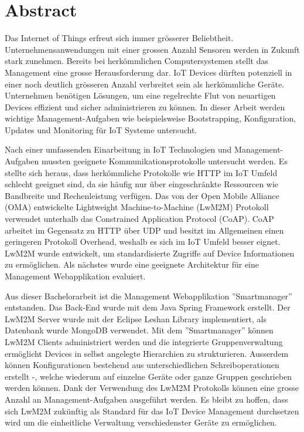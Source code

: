 \chapter*{Abstract}
Das Internet of Things erfreut sich immer grösserer Beliebtheit. Unternehmensanwendungen mit einer grossen Anzahl Sensoren werden in Zukunft stark zunehmen. Bereits bei herkömmlichen Computersystemen stellt das Management eine grosse Herausforderung dar. IoT Devices dürften potenziell in einer noch deutlich grösseren Anzahl verbreitet sein als herkömmliche Geräte. Unternehmen benötigen Lösungen, um eine regelrechte Flut von neuartigen Devices effizient und sicher administrieren zu können. In dieser Arbeit werden wichtige Management-Aufgaben wie beispielsweise Bootstrapping, Konfiguration, Updates und Monitoring für IoT Systeme untersucht.

Nach einer umfassenden Einarbeitung in IoT Technologien und Management-Aufgaben mussten geeignete Kommunikationsprotokolle untersucht werden. Es stellte sich heraus, dass herkömmliche Protokolle wie HTTP im IoT Umfeld schlecht geeignet sind, da sie häufig nur über eingeschränkte Ressourcen wie Bandbreite und Rechenleistung verfügen. Das von der Open Mobile Alliance (OMA) entwickelte Lightweight Machine-to-Machine (LwM2M) Protokoll verwendet unterhalb das Constrained Application Protocol (CoAP). CoAP arbeitet im Gegensatz zu HTTP über UDP und besitzt im Allgemeinen einen geringeren Protokoll Overhead, weshalb es sich im IoT Umfeld besser eignet. LwM2M wurde entwickelt, um standardisierte Zugriffe auf Device Informationen zu ermöglichen. Als nächstes wurde eine geeignete Architektur für eine Management Webapplikation evaluiert.

Aus dieser Bachelorarbeit ist die Management Webapplikation ''Smartmanager'' entstanden. Das Back-End wurde mit dem Java Spring Framework erstellt. Der LwM2M Server wurde mit der Eclipse Leshan Library implementiert, als Datenbank wurde MongoDB verwendet. Mit dem ''Smartmanager'' können LwM2M Clients administriert werden und die integrierte Gruppenverwaltung ermöglicht Devices in selbst angelegte Hierarchien zu strukturieren. Ausserdem können Konfigurationen bestehend aus unterschiedlichen Schreiboperationen erstellt -, welche wiederum auf einzelne Geräte oder ganze Gruppen geschrieben werden können. Dank der Verwendung des LwM2M Protokolls können eine grosse Anzahl an Management-Aufgaben ausgeführt werden. Es bleibt zu hoffen, dass sich LwM2M zukünftig als Standard für das IoT Device Management durchsetzen wird um die einheitliche Verwaltung verschiedenster Geräte zu ermöglichen.
